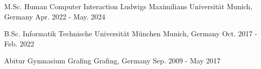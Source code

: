 

\begin{cventries}

  \cventry
  {M.Sc. Human Computer Interaction} %
  {Ludwigs Maximilians Universität} %
  {Munich, Germany} %
  {Apr. 2022 - May. 2024} %
  {}

  \cventry
  {B.Sc. Informatik} %
  {Technische Universität München} %
  {Munich, Germany} %
  {Oct. 2017 - Feb. 2022} %
  {}

  \cventry
  {Abitur} %
  {Gymnasium Grafing} %
  {Grafing, Germany} %
  {Sep. 2009 - May 2017} %
  {}

\end{cventries}

